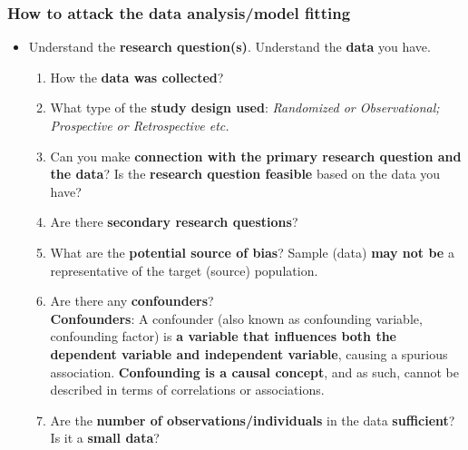 \documentclass[10pt]{beamer} %
\begin{document}
\begin{frame}
   \frametitle{How to attack the data analysis/model fitting}
   \begin{itemize}
      \item Understand the \textbf{research question(s)}. Understand the \textbf{data} you have. 
         \vspace{0.2cm}			
         \begin{enumerate}
            \item How the \textbf{data was collected}?
               \vspace{0.2cm}			
            \item What type of the \textbf{study design used}:
               \textit{Randomized or Observational; Prospective or Retrospective
               etc. }
               \vspace{0.2cm}						
            \item Can you make \textbf{connection with the primary research
               question and the data}? Is the \textbf{research question
               feasible} based on the data you have?
               \vspace{0.2cm}			
            \item Are there \textbf{secondary research questions}?
               \vspace{0.2cm}			
            \item  What are the \textbf{potential source of bias}? Sample (data)
               \textbf{may not be} a representative of the target (source)
               population.
               \vspace{0.2cm}			
            \item Are there any \textbf{confounders}? \\
               \textbf{Confounders}: A confounder (also known as confounding
               variable, confounding factor) is \textbf{a variable that
               influences both the dependent variable and independent variable},
               causing a spurious association. \textbf{Confounding is a causal
               concept}, and as such, cannot be described in terms of
               correlations or associations.
               \vspace{0.2cm}			
            \item  Are the \textbf{number of observations/individuals} in the
               data \textbf{sufficient}? Is it a \textbf{small data}?
         \end{enumerate}
   \end{itemize}	
\end{frame}
\end{document}
